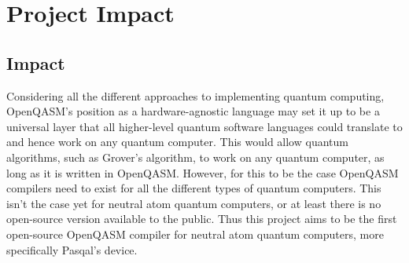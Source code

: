 \section{Project Impact}
\label{sec:impact}

\subsection{Impact}
\label{sec:Impact}
Considering all the different approaches to implementing quantum computing, OpenQASM's position as a hardware-agnostic language may set it up to be
 a universal layer that all higher-level quantum software languages could translate to and hence work on any quantum computer. This would allow quantum algorithms, such as 
 Grover's algorithm, to work on any quantum computer, as long as it is written in OpenQASM. However, for this to be the case OpenQASM compilers need to exist for all 
 the different types of quantum computers. This isn't the case yet for neutral atom quantum computers, or at least there is no open-source version available to the public.
 Thus this project aims to be the first open-source OpenQASM compiler for neutral atom quantum computers, more specifically Pasqal's device.

